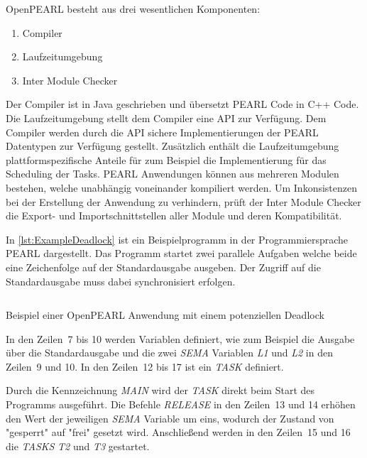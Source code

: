 OpenPEARL besteht aus drei wesentlichen
Komponenten:\autocite{OpenPEARL_Structure}
\begin{enumerate}
  \item Compiler
  \item Laufzeitumgebung
  \item Inter Module Checker
\end{enumerate}
Der Compiler ist in Java geschrieben und übersetzt PEARL Code in C++ Code. Die
Laufzeitumgebung stellt dem Compiler eine API zur Verfügung. Dem Compiler werden
durch die API sichere Implementierungen der PEARL Datentypen zur Verfügung
gestellt. Zusätzlich enthält die Laufzeitumgebung plattformspezifische Anteile
für zum Beispiel die Implementierung für das Scheduling der Tasks. PEARL
Anwendungen können aus mehreren Modulen bestehen, welche unabhängig voneinander
kompiliert werden. Um Inkonsistenzen bei der Erstellung der Anwendung zu
verhindern, prüft der Inter Module Checker die Export- und Importschnittstellen
aller Module und deren Kompatibilität.\autocite{OpenPEARL_Structure}

In \cref{lst:ExampleDeadlock} ist ein Beispielprogramm in der Programmiersprache
PEARL dargestellt. Das Programm startet zwei parallele Aufgaben welche beide
eine Zeichenfolge auf der Standardausgabe ausgeben. Der Zugriff auf die
Standardausgabe muss dabei synchronisiert erfolgen.
\begin{listing}[ht]
  \inputminted[frame=lines,linenos]{vim}{./Examples/Example_Deadlock.prl}
  \caption{Beispiel einer OpenPEARL Anwendung mit einem potenziellen Deadlock}
  \label{lst:ExampleDeadlock}   
\end{listing} 
In den Zeilen~7 bis 10 werden Variablen definiert, wie zum Beispiel die Ausgabe
über die Standardausgabe und die zwei \emph{SEMA} Variablen \emph{L1} und
\emph{L2} in den Zeilen~9 und 10. In den Zeilen~12 bis 17 ist ein \emph{TASK}
definiert.

Durch die Kennzeichnung \emph{MAIN} wird der \emph{TASK} direkt beim Start des
Programms ausgeführt\autocite[vgl.][28]{PEARL}. Die Befehle \emph{RELEASE} in
den Zeilen~13 und 14 erhöhen den Wert der jeweiligen \emph{SEMA} Variable um
eins, wodurch der Zustand von "gesperrt" auf "frei" gesetzt wird. Anschließend
werden in den Zeilen~15 und 16 die \emph{TASKS} \emph{T2} und \emph{T3}
gestartet.

